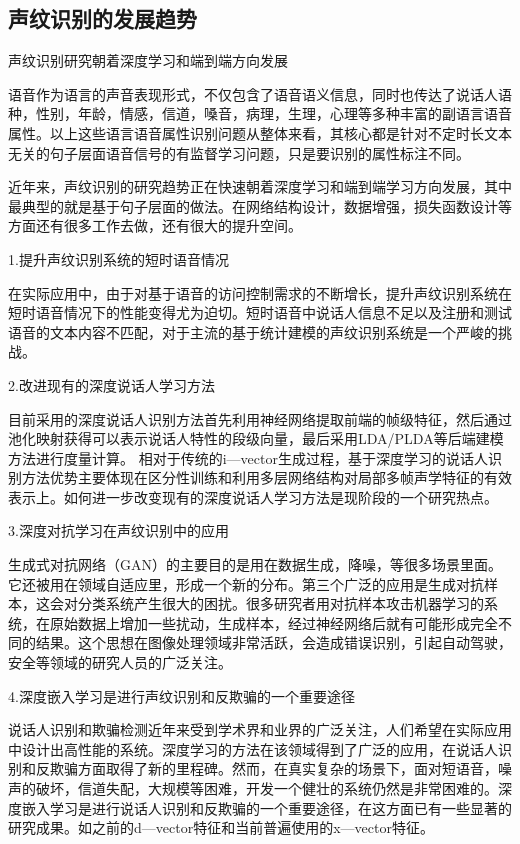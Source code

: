 \documentclass{article}
\begin{document}
\subsection{声纹识别的发展趋势}
声纹识别研究朝着深度学习和端到端方向发展\par 
语音作为语言的声音表现形式，不仅包含了语音语义信息，同时也传达了说话人语种，性别，年龄，情感，信道，嗓音，病理，生理，心理等多种丰富的副语言语音属性。以上这些语言语音属性识别问题从整体来看，其核心都是针对不定时长文本无关的句子层面语音信号的有监督学习问题，只是要识别的属性标注不同。\par 
近年来，声纹识别的研究趋势正在快速朝着深度学习和端到端学习方向发展，其中最典型的就是基于句子层面的做法。在网络结构设计，数据增强，损失函数设计等方面还有很多工作去做，还有很大的提升空间。\par 
1.提升声纹识别系统的短时语音情况\par 
在实际应用中，由于对基于语音的访问控制需求的不断增长，提升声纹识别系统在短时语音情况下的性能变得尤为迫切。短时语音中说话人信息不足以及注册和测试语音的文本内容不匹配，对于主流的基于统计建模的声纹识别系统是一个严峻的挑战。\par 
2.改进现有的深度说话人学习方法\par 
目前采用的深度说话人识别方法首先利用神经网络提取前端的帧级特征，然后通过池化映射获得可以表示说话人特性的段级向量，最后采用LDA/PLDA等后端建模方法进行度量计算。
相对于传统的i—vector生成过程，基于深度学习的说话人识别方法优势主要体现在区分性训练和利用多层网络结构对局部多帧声学特征的有效表示上。如何进一步改变现有的深度说话人学习方法是现阶段的一个研究热点。\par 
3.深度对抗学习在声纹识别中的应用\par 
生成式对抗网络（GAN）的主要目的是用在数据生成，降噪，等很多场景里面。它还被用在领域自适应里，形成一个新的分布。第三个广泛的应用是生成对抗样本，这会对分类系统产生很大的困扰。很多研究者用对抗样本攻击机器学习的系统，在原始数据上增加一些扰动，生成样本，经过神经网络后就有可能形成完全不同的结果。这个思想在图像处理领域非常活跃，会造成错误识别，引起自动驾驶，安全等领域的研究人员的广泛关注。\par 
4.深度嵌入学习是进行声纹识别和反欺骗的一个重要途径\par 
说话人识别和欺骗检测近年来受到学术界和业界的广泛关注，人们希望在实际应用中设计出高性能的系统。深度学习的方法在该领域得到了广泛的应用，在说话人识别和反欺骗方面取得了新的里程碑。然而，在真实复杂的场景下，面对短语音，噪声的破坏，信道失配，大规模等困难，开发一个健壮的系统仍然是非常困难的。深度嵌入学习是进行说话人识别和反欺骗的一个重要途径，在这方面已有一些显著的研究成果。如之前的d—vector特征和当前普遍使用的x—vector特征。\par 
	
\end{document}
